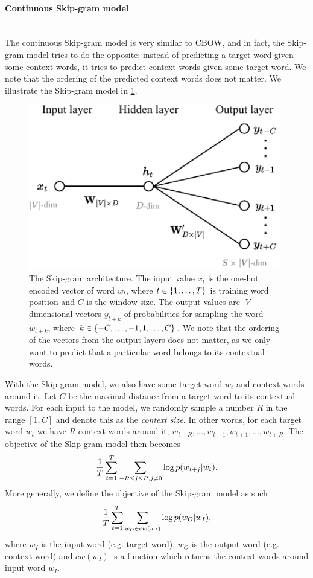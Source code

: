 \paragraph*{Continuous Skip-gram model}\mbox{} \\
The continuous Skip-gram model is very similar to CBOW, and in fact, the Skip-gram model tries to do the opposite; instead of predicting a target word given some context words, it tries to predict context words given some target word. We note that the ordering of the predicted context words does not matter. We illustrate the Skip-gram model in \cref{fig:skip-gram-model}.
\begin{figure}[H]
    \centering
    \includegraphics[width=11cm]{thesis/figures/skim-gram_cropped.pdf}
    \caption{The Skip-gram architecture. The input value $x_t$ is the one-hot encoded vector of word $w_t$, where $t \in \left\{1, \ldots, T\right\}$ is training word position and $C$ is the window size. The output values are $|V|$-dimensional vectors $y_{t+k}$ of probabilities for sampling the word $w_{t+k}$, where $k \in \left\{-C, \ldots, -1, 1, \ldots, C\right\}$. We note that the ordering of the vectors from the output layers does not matter, as we only want to predict that a particular word belongs to its contextual words.}
    \label{fig:skip-gram-model}
\end{figure}

With the Skip-gram model, we also have some target word $w_t$ and context words around it. Let $C$ be the maximal distance from a target word to its contextual words. For each input to the model, we randomly sample a number $R$ in the range $[1, C]$ and denote this as the \textit{context size}. In other words, for each target word $w_t$ we have $R$ context words around it, $w_{t-R}, \ldots, w_{t-1}, w_{t+1}, \ldots, w_{t+R}$. The objective of the Skip-gram model then becomes
\begin{align}
    \frac{1}{T} \sum\limits_{t=1}^{T} \sum\limits_{-R \leq j \leq R, j \neq 0}^{} \log p(w_{t+j} | w_t).
    \label{eqn:skip-gram-objective-function}
\end{align}
More generally, we define the objective of the Skip-gram model as such
\begin{align}
    \frac{1}{T} \sum\limits_{t=1}^{T} \sum\limits_{w_O \in cw(w_I)}^{} \log p(w_O | w_I),
    \label{eqn:skip-gram-objective-function-general}
\end{align}
where $w_I$ is the input word (e.g. target word), $w_O$ is the output word (e.g. context word) and $cw(w_I)$ is a function which returns the context words around input word $w_I$.


